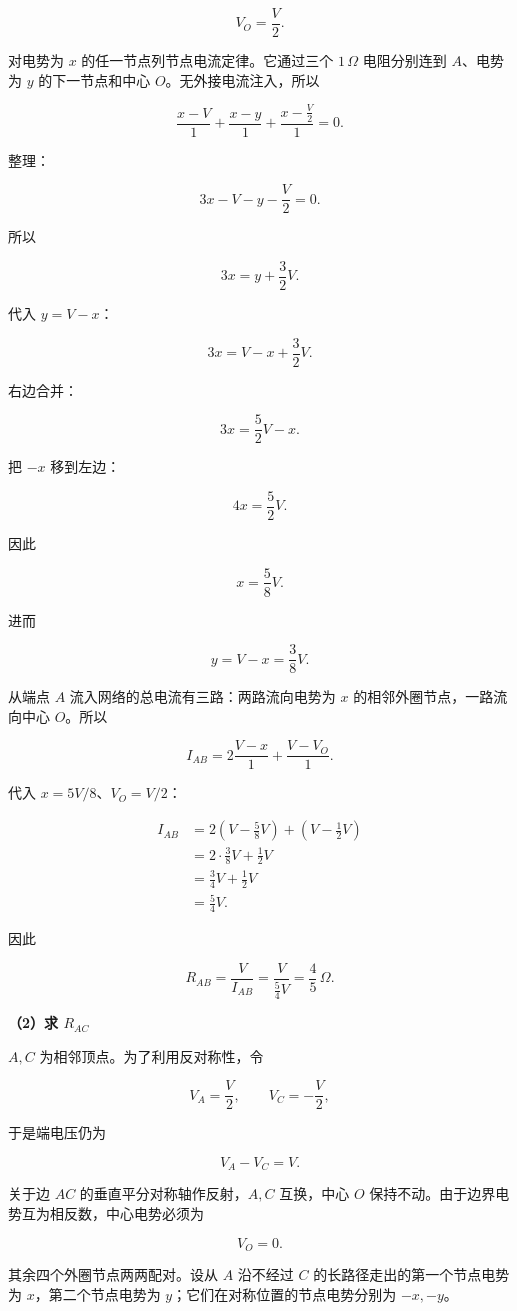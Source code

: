 \documentclass[12pt,a4paper,UTF8]{ctexart}
\begin{document}
\[V_O=\frac V2.\]

对电势为 \(x\) 的任一节点列节点电流定律。它通过三个 \(1\,\Omega\)
电阻分别连到 \(A\)、电势为 \(y\) 的下一节点和中心
\(O\)。无外接电流注入，所以

\[\frac{x-V}{1}
+\frac{x-y}{1}
+\frac{x-\frac V2}{1}=0.\]

整理：

\[3x-V-y-\frac V2=0.\]

所以

\[3x=y+\frac32V.\]

代入 \(y=V-x\)：

\[3x=V-x+\frac32V.\]

右边合并：

\[3x=\frac52V-x.\]

把 \(-x\) 移到左边：

\[4x=\frac52V.\]

因此

\[x=\frac58V.\]

进而

\[y=V-x=\frac38V.\]

从端点 \(A\) 流入网络的总电流有三路：两路流向电势为 \(x\)
的相邻外圈节点，一路流向中心 \(O\)。所以

\[I_{AB}
=2\frac{V-x}{1}
+\frac{V-V_O}{1}.\]

代入 \(x=5V/8\)、\(V_O=V/2\)：

\[\begin{aligned}
I_{AB}
&=2\left(V-\frac58V\right)
+\left(V-\frac12V\right)\\
&=2\cdot\frac38V+\frac12V\\
&=\frac34V+\frac12V\\
&=\frac54V.
\end{aligned}\]

因此

\[\boxed{
R_{AB}=\frac{V}{I_{AB}}
=\frac{V}{\frac54V}
=\frac45\,\Omega
}.\]

\textbf{（2）求 \(R_{AC}\)}

\(A,C\) 为相邻顶点。为了利用反对称性，令

\[V_A=\frac V2,\qquad
V_C=-\frac V2,\]

于是端电压仍为

\[V_A-V_C=V.\]

关于边 \(AC\) 的垂直平分对称轴作反射，\(A,C\) 互换，中心 \(O\)
保持不动。由于边界电势互为相反数，中心电势必须为

\[V_O=0.\]

其余四个外圈节点两两配对。设从 \(A\) 沿不经过 \(C\)
的长路径走出的第一个节点电势为 \(x\)，第二个节点电势为
\(y\)；它们在对称位置的节点电势分别为 \(-x,-y\)。
\end{document}
